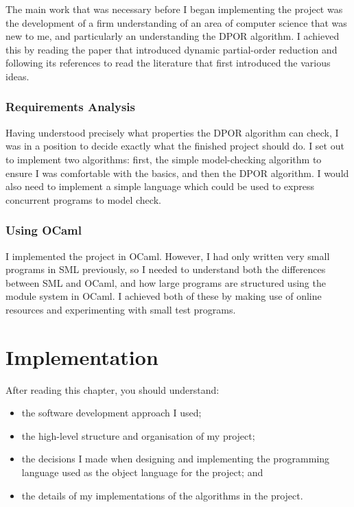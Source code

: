 \documentclass[12pt,a4paper,twoside,openright]{report}
\newenvironment{understandinglist}
	{\begin{itemize} \itemsep 0em}{\end{itemize}}
\begin{document}
The main work that was necessary before
I began implementing the project was the
development of a firm understanding of an
area of computer science that was new to me,
and particularly an understanding the DPOR algorithm.
I achieved this by reading the paper that
introduced dynamic partial-order reduction \cite{flan05}
and following
its references to read the literature that
first introduced the various ideas.

\subsection{Requirements Analysis}
Having
understood precisely what properties the
DPOR algorithm can check, I was in a
position to decide exactly what the
finished project should do.
I set out to implement two algorithms:
first, the simple model-checking
algorithm to ensure I was comfortable
with the basics, and then the DPOR
algorithm. I would also need to
implement a simple language which
could be used to express concurrent
programs to model check.

\subsection{Using OCaml}
I implemented the project in OCaml.
However, I had only written very small
programs in SML previously, so I needed to
understand both the differences between
SML and OCaml, and how large programs
are structured using the module system
in OCaml. I achieved both of these
by making use of online resources and
experimenting with small test programs.

\chapter{Implementation}
\label{cha:imp}
After reading this chapter,
you should understand:
\begin{understandinglist}
	\item the software development approach
	I used;
	\item the high-level structure and
	organisation of my project;
	\item the decisions I made
	when designing and implementing
	the programming language used
	as the object language for the
	project; and
	\item the details of my
	implementations of the
	algorithms in the project.
\end{understandinglist}
\end{document}
